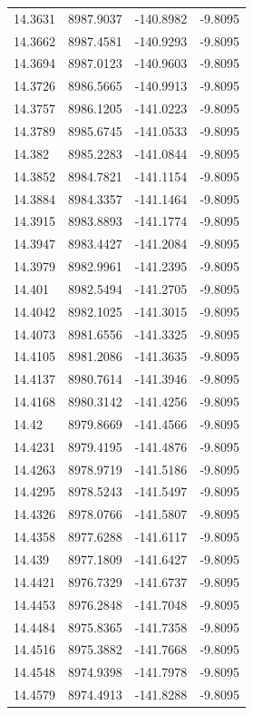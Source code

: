 \begin{table}[H]
\begin{tabular}{llll}
14.3631 & 8987.9037 & -140.8982 & -9.8095 \\
14.3662 & 8987.4581 & -140.9293 & -9.8095 \\
14.3694 & 8987.0123 & -140.9603 & -9.8095 \\
14.3726 & 8986.5665 & -140.9913 & -9.8095 \\
14.3757 & 8986.1205 & -141.0223 & -9.8095 \\
14.3789 & 8985.6745 & -141.0533 & -9.8095 \\
14.382 & 8985.2283 & -141.0844 & -9.8095 \\
14.3852 & 8984.7821 & -141.1154 & -9.8095 \\
14.3884 & 8984.3357 & -141.1464 & -9.8095 \\
14.3915 & 8983.8893 & -141.1774 & -9.8095 \\
14.3947 & 8983.4427 & -141.2084 & -9.8095 \\
14.3979 & 8982.9961 & -141.2395 & -9.8095 \\
14.401 & 8982.5494 & -141.2705 & -9.8095 \\
14.4042 & 8982.1025 & -141.3015 & -9.8095 \\
14.4073 & 8981.6556 & -141.3325 & -9.8095 \\
14.4105 & 8981.2086 & -141.3635 & -9.8095 \\
14.4137 & 8980.7614 & -141.3946 & -9.8095 \\
14.4168 & 8980.3142 & -141.4256 & -9.8095 \\
14.42 & 8979.8669 & -141.4566 & -9.8095 \\
14.4231 & 8979.4195 & -141.4876 & -9.8095 \\
14.4263 & 8978.9719 & -141.5186 & -9.8095 \\
14.4295 & 8978.5243 & -141.5497 & -9.8095 \\
14.4326 & 8978.0766 & -141.5807 & -9.8095 \\
14.4358 & 8977.6288 & -141.6117 & -9.8095 \\
14.439 & 8977.1809 & -141.6427 & -9.8095 \\
14.4421 & 8976.7329 & -141.6737 & -9.8095 \\
14.4453 & 8976.2848 & -141.7048 & -9.8095 \\
14.4484 & 8975.8365 & -141.7358 & -9.8095 \\
14.4516 & 8975.3882 & -141.7668 & -9.8095 \\
14.4548 & 8974.9398 & -141.7978 & -9.8095 \\
14.4579 & 8974.4913 & -141.8288 & -9.8095 \\

\end{tabular}
\end{table}
